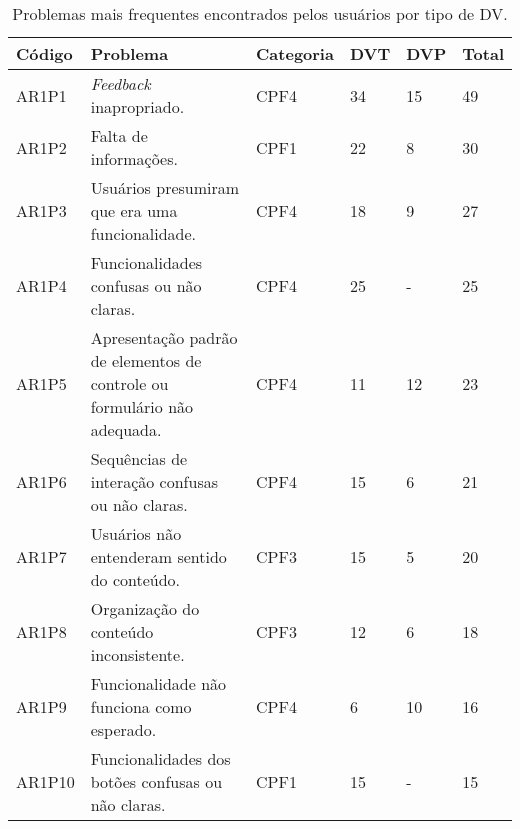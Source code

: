 \begin{table}[htb]
  \begin{center}
    \ABNTEXfontereduzida
    \caption{Problemas mais frequentes encontrados pelos usuários por tipo de DV.}
    \label{tab-pro-blind-1}
    \begin{tabular}{p{1.2cm}|p{8.7cm}|p{1.4cm}|p{0.6cm}|p{0.6cm}|p{0.7cm}}
      \textbf{Código} & \textbf{Problema}                                                        & \textbf{Categoria} & \textbf{DVT} & \textbf{DVP} & \textbf{Total} \\
      \hline
      AR1P1           & \emph{Feedback} inapropriado.                                            & CPF4               & 34           & 15           & 49             \\
      \hline
      AR1P2           & Falta de informações.                                                    & CPF1               & 22           & 8            & 30             \\
      \hline
      AR1P3           & Usuários presumiram que era uma funcionalidade.                          & CPF4               & 18           & 9            & 27             \\
      \hline
      AR1P4           & Funcionalidades confusas ou não claras.                                  & CPF4               & 25           & -            & 25             \\
      \hline
      AR1P5           & Apresentação padrão de elementos de controle ou formulário não adequada. & CPF4               & 11           & 12           & 23             \\
      \hline
      AR1P6           & Sequências de interação confusas ou não claras.                          & CPF4               & 15           & 6            & 21             \\
      \hline
      AR1P7           & Usuários não entenderam sentido do conteúdo.                             & CPF3               & 15           & 5            & 20             \\
      \hline
      AR1P8           & Organização do conteúdo inconsistente.                                   & CPF3               & 12           & 6            & 18             \\
      \hline
      AR1P9           & Funcionalidade não funciona como esperado.                               & CPF4               & 6            & 10           & 16             \\
      \hline
      AR1P10          & Funcionalidades dos botões confusas ou não claras.                       & CPF1               & 15           & -            & 15             \\

\end{tabular}
\end{center}
\end{table}
